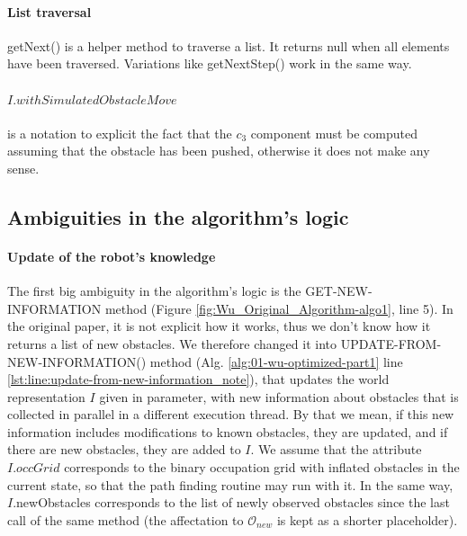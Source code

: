 \paragraph{List traversal} getNext() is a helper method to traverse a list. It returns null when all elements have been traversed. Variations like getNextStep() work in the same way.

\paragraph{$I.withSimulatedObstacleMove$} is a notation to explicit the fact that the $c_{3}$ component must be computed assuming that the obstacle has been pushed, otherwise it does not make any sense.

\subsection{Ambiguities in the algorithm's logic}

\paragraph{Update of the robot's knowledge} The first big ambiguity in the algorithm's logic is the GET-NEW-INFORMATION method (Figure \ref{fig:Wu_Original_Algorithm-algo1}, line 5). In the original paper, it is not explicit how it works, thus we don't know how it returns a list of new obstacles. We therefore changed it into UPDATE-FROM-NEW-INFORMATION() method (Alg. \ref{alg:01-wu-optimized-part1} line \ref{lst:line:update-from-new-information_note}), that updates the world representation $I$ given in parameter, with new information about obstacles that is collected in parallel in a different execution thread. By that we mean, if this new information includes modifications to known obstacles, they are updated, and if there are new obstacles, they are added to $I$. We assume that the attribute $I.occGrid$ corresponds to the binary occupation grid with inflated obstacles in the current state, so that the path finding routine may run with it. In the same way, $I$.newObstacles corresponds to the list of newly observed obstacles since the last call of the same method (the affectation to $\mathcal{O}_{new}$ is kept as a shorter placeholder).

